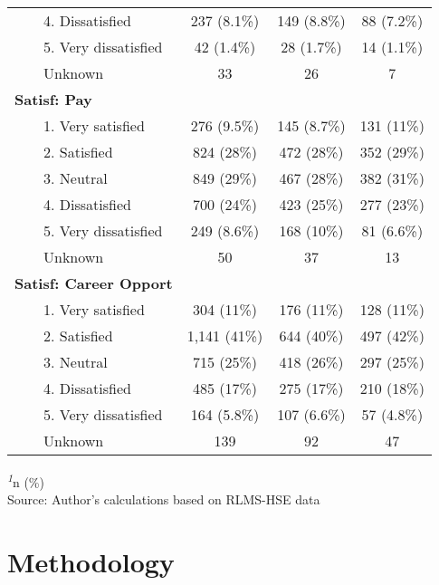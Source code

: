 \documentclass[
]{interact}
\begin{document}
\begin{table}
{\begin{tabular*}{\linewidth}{@{\extracolsep{\fill}}lccc}
    4. Dissatisfied & 237 (8.1\%) & 149 (8.8\%) & 88 (7.2\%) \\ 
    5. Very dissatisfied & 42 (1.4\%) & 28 (1.7\%) & 14 (1.1\%) \\ 
    Unknown & 33 & 26 & 7 \\ 
{\bfseries Satisf: Pay} &  &  &  \\ 
    1. Very satisfied & 276 (9.5\%) & 145 (8.7\%) & 131 (11\%) \\ 
    2. Satisfied & 824 (28\%) & 472 (28\%) & 352 (29\%) \\ 
    3. Neutral & 849 (29\%) & 467 (28\%) & 382 (31\%) \\ 
    4. Dissatisfied & 700 (24\%) & 423 (25\%) & 277 (23\%) \\ 
    5. Very dissatisfied & 249 (8.6\%) & 168 (10\%) & 81 (6.6\%) \\ 
    Unknown & 50 & 37 & 13 \\ 
{\bfseries Satisf: Career Opport} &  &  &  \\ 
    1. Very satisfied & 304 (11\%) & 176 (11\%) & 128 (11\%) \\ 
    2. Satisfied & 1,141 (41\%) & 644 (40\%) & 497 (42\%) \\ 
    3. Neutral & 715 (25\%) & 418 (26\%) & 297 (25\%) \\ 
    4. Dissatisfied & 485 (17\%) & 275 (17\%) & 210 (18\%) \\ 
    5. Very dissatisfied & 164 (5.8\%) & 107 (6.6\%) & 57 (4.8\%) \\ 
    Unknown & 139 & 92 & 47 \\ 
\bottomrule
\end{tabular*}
\begin{minipage}{\linewidth}
\textsuperscript{\textit{1}}n (\%)\\
Source: Author's calculations based on RLMS-HSE data\\
\end{minipage}

}

\end{table}%

\section{Methodology}\label{methodology}
\end{document}
